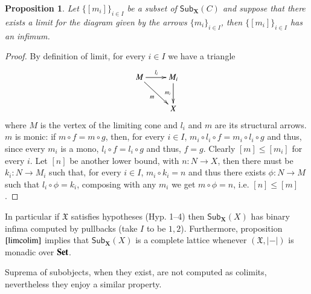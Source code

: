\documentclass[12pt]{article}
\newtheorem{proposition}[lemma]{Proposition}
\theoremstyle{definition}
\def\X{\mathfrak X}
\newcommand{\Set}{\textbf{\textup{Set}}}
\numberwithin{equation}{section}
\newcommand{\catname}[1]{\mathbf{#1}}
\newcommand{\sub}[1]{\mathsf{Sub}_{\catname{#1}}}
\begin{document}
\begin{proposition}\label{lim_inf}
	Let $\{[m_i]\}_{i\in I}$ be a subset of $\sub{X}(C)$ and suppose that there exists a limit for the diagram given by the arrows $\{m_i\}_{i\in I}$, then $\{[m_i]\}_{i\in I}$ has an infimum.
\end{proposition}
\begin{proof}
By definition of limit, for every $i\in I$ we have a triangle
\[\xymatrix{M\ar[r]^{l_i}\ar[dr]_{m} & M_i\ar[d]_{m_i}\\ & X}\]	
where $M$ is the vertex of the limiting cone and $l_i$ and $m$ are its structural arrows. $m$ is monic: if $m\circ f=m\circ g$, then, for every $i\in I$, $m_i\circ l_i\circ f=m_i\circ l_i \circ g$ and thus, since every $m_i$ is a mono, $l_i\circ f=l_i\circ g$ and thus, $f=g$. Clearly $[m]\leq [m_i]$ for every $i$. Let $[n]$ be another lower bound, with $n:N\rightarrow X$, then there must be $k_i:N\rightarrow M_i$ such that, for every $i\in I$, $m_i\circ k_i=n$ and thus there exists $\phi:N\rightarrow M$ such that $l_i\circ \phi = k_i$, composing with any $m_i$ we get $m\circ \phi =n$, i.e. $[n]\leq [m]$.
\end{proof}

In particular if $\X$ satisfies hypotheses (Hyp. 1--4) then $\sub{X}(X)$ has binary infima computed by pullbacks (take $I$ to be ${1,2}$). Furthermore, proposition $\ref{limcolim}$ implies that  $\sub{X}(X)$ is a complete lattice whenever $(\X, |-|)$ is monadic over $\Set$.

Suprema of subobjects, when they exist, are not computed as colimits, nevertheless they enjoy a similar property.
\end{document}
